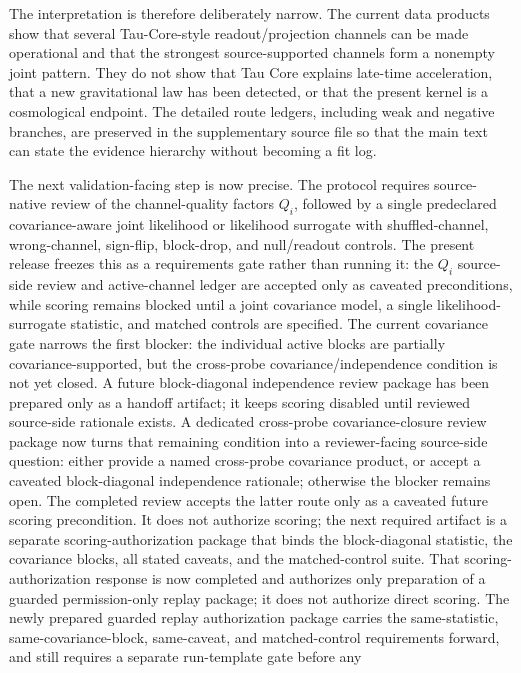 The interpretation is therefore deliberately narrow.  The current data products
show that several Tau-Core-style readout/projection channels can be made
operational and that the strongest source-supported channels form a nonempty
joint pattern.  They do not show that Tau Core explains late-time acceleration,
that a new gravitational law has been detected, or that the present kernel is a
cosmological endpoint.  The detailed route ledgers, including weak and negative
branches, are preserved in the supplementary source file so that the main text
can state the evidence hierarchy without becoming a fit log.

The next validation-facing step is now precise.  The protocol requires
source-native review of the channel-quality factors \(Q_i\), followed by a
single predeclared covariance-aware joint likelihood or likelihood surrogate
with shuffled-channel, wrong-channel, sign-flip, block-drop, and null/readout
controls.  The present release freezes this as a requirements gate rather than
running it: the \(Q_i\) source-side review and active-channel ledger are accepted
only as caveated preconditions, while scoring remains blocked until a joint
covariance model, a single likelihood-surrogate statistic, and matched controls
are specified.  The current covariance gate narrows the first blocker: the
individual active blocks are partially covariance-supported, but the
cross-probe covariance/independence condition is not yet closed.  A future
block-diagonal independence review package has been prepared only as a handoff
artifact; it keeps scoring disabled until reviewed source-side rationale exists.
A dedicated cross-probe covariance-closure review package now turns that
remaining condition into a reviewer-facing source-side question: either provide
a named cross-probe covariance product, or accept a caveated block-diagonal
independence rationale; otherwise the blocker remains open.
The completed review accepts the latter route only as a caveated future scoring
precondition.  It does not authorize scoring; the next required artifact is a
separate scoring-authorization package that binds the block-diagonal statistic,
the covariance blocks, all stated caveats, and the matched-control suite.
That scoring-authorization response is now completed and authorizes only
preparation of a guarded permission-only replay package; it does not authorize
direct scoring.  The newly prepared guarded replay authorization package carries
the same-statistic, same-covariance-block, same-caveat, and matched-control
requirements forward, and still requires a separate run-template gate before any
